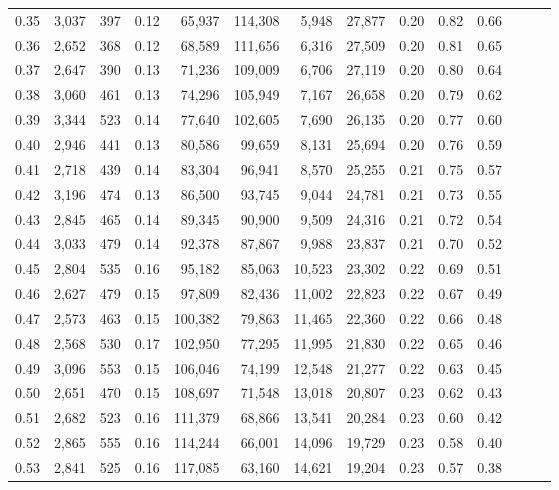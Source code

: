 \begin{tabular}{rrrrrrrrrrrrrr}
0.35 &  3,037 &  397 &  0.12 &   65,937 &  114,308 &   5,948 &  27,877 &  0.20 &  0.82 &      0.66 \\
0.36 &  2,652 &  368 &  0.12 &   68,589 &  111,656 &   6,316 &  27,509 &  0.20 &  0.81 &      0.65 \\
0.37 &  2,647 &  390 &  0.13 &   71,236 &  109,009 &   6,706 &  27,119 &  0.20 &  0.80 &      0.64 \\
0.38 &  3,060 &  461 &  0.13 &   74,296 &  105,949 &   7,167 &  26,658 &  0.20 &  0.79 &      0.62 \\
0.39 &  3,344 &  523 &  0.14 &   77,640 &  102,605 &   7,690 &  26,135 &  0.20 &  0.77 &      0.60 \\
0.40 &  2,946 &  441 &  0.13 &   80,586 &   99,659 &   8,131 &  25,694 &  0.20 &  0.76 &      0.59 \\
0.41 &  2,718 &  439 &  0.14 &   83,304 &   96,941 &   8,570 &  25,255 &  0.21 &  0.75 &      0.57 \\
0.42 &  3,196 &  474 &  0.13 &   86,500 &   93,745 &   9,044 &  24,781 &  0.21 &  0.73 &      0.55 \\
0.43 &  2,845 &  465 &  0.14 &   89,345 &   90,900 &   9,509 &  24,316 &  0.21 &  0.72 &      0.54 \\
0.44 &  3,033 &  479 &  0.14 &   92,378 &   87,867 &   9,988 &  23,837 &  0.21 &  0.70 &      0.52 \\
0.45 &  2,804 &  535 &  0.16 &   95,182 &   85,063 &  10,523 &  23,302 &  0.22 &  0.69 &      0.51 \\
0.46 &  2,627 &  479 &  0.15 &   97,809 &   82,436 &  11,002 &  22,823 &  0.22 &  0.67 &      0.49 \\
0.47 &  2,573 &  463 &  0.15 &  100,382 &   79,863 &  11,465 &  22,360 &  0.22 &  0.66 &      0.48 \\
0.48 &  2,568 &  530 &  0.17 &  102,950 &   77,295 &  11,995 &  21,830 &  0.22 &  0.65 &      0.46 \\
0.49 &  3,096 &  553 &  0.15 &  106,046 &   74,199 &  12,548 &  21,277 &  0.22 &  0.63 &      0.45 \\
0.50 &  2,651 &  470 &  0.15 &  108,697 &   71,548 &  13,018 &  20,807 &  0.23 &  0.62 &      0.43 \\
0.51 &  2,682 &  523 &  0.16 &  111,379 &   68,866 &  13,541 &  20,284 &  0.23 &  0.60 &      0.42 \\
0.52 &  2,865 &  555 &  0.16 &  114,244 &   66,001 &  14,096 &  19,729 &  0.23 &  0.58 &      0.40 \\
0.53 &  2,841 &  525 &  0.16 &  117,085 &   63,160 &  14,621 &  19,204 &  0.23 &  0.57 &      0.38 \\

\end{tabular}
